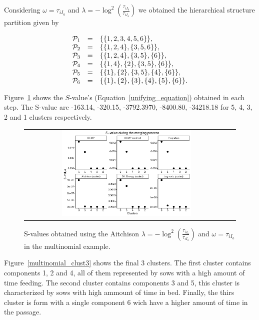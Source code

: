 \documentclass[submit]{smj}
\theoremstyle{definition}
\begin{document}
Considering $\omega = \tau_{i I_a}$ and $\lambda = -\log^2 \left(\frac{ \tau_{iI_b} }{ \tau_{iI_a} }\right)$ we obtained the hierarchical structure partition given by


\begin{equation}
\begin{array}{r c l}
\mathcal{P}_1 &=& \{\{1,2,3,4,5,6\}\}, \\ 
\mathcal{P}_2 &=& \{\{1,2,4\},\{3,5,6\}\}, \\ 
\mathcal{P}_3 &=& \{\{1,2,4\},\{3,5\},\{6\}\}, \\ 
\mathcal{P}_4 &=& \{\{1,4\},\{2\},\{3,5\},\{6\}\}, \\ 
\mathcal{P}_5 &=& \{\{1\},\{2\},\{3,5\},\{4\},\{6\}\}, \\ 
\mathcal{P}_6 &=& \{\{1\},\{2\},\{3\},\{4\},\{5\},\{6\} \}.
\end{array}
\label{hier_ex_multinomial}
\end{equation}

Figure~\ref{multinomial_Svalues} shows the $S$-value's (Equation~\ref{unifying_equation}) obtained in each step. The S-value are -163.14,   -320.15,  -3792.3970,  -8400.80, -34218.18 for 5, 4, 3, 2 and 1 clusters respectively.

\begin{figure}[t]
\begin{center}
\begin{tabular}{cc}
  \includegraphics[width=0.65\textwidth]{figures/multinomial_Svalues_all.pdf} \\
 \end{tabular}
 \caption{S-values obtained using the Aitchison $\lambda = -\log^2 \left(\frac{ \tau_{iI_b} }{ \tau_{iI_a} }\right)$ and $\omega = \tau_{i I_a}$ in the multinomial example.}\label{multinomial_Svalues}
\end{center}
\end{figure}

Figure~\ref{multinomial_clust3} shows the final 3 clusters. The first cluster contains components 1, 2 and 4, all of them represented by sows with a high amount of time feeding. The second cluster contains components 3 and 5, this cluster is characterized by sows with high ammount of time in bed. Finally, the thirs cluster is form with a single component 6 wich have a higher amount of time in the passage.
\end{document}
